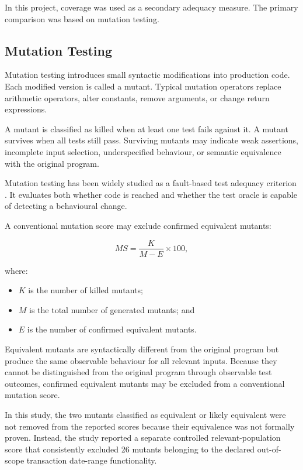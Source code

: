 \documentclass[12pt]{article}
\begin{document}
In this project, coverage was used as a secondary adequacy measure. The primary
comparison was based on mutation testing.

\subsection{Mutation Testing}

Mutation testing introduces small syntactic modifications into production
code. Each modified version is called a mutant. Typical mutation operators
replace arithmetic operators, alter constants, remove arguments, or change
return expressions.

A mutant is classified as killed when at least one test fails against it. A
mutant survives when all tests still pass. Surviving mutants may indicate weak
assertions, incomplete input selection, underspecified behaviour, or semantic
equivalence with the original program.

Mutation testing has been widely studied as a fault-based test adequacy
criterion \cite{jia2011mutation}. It evaluates both whether code is reached and
whether the test oracle is capable of detecting a behavioural change.

A conventional mutation score may exclude confirmed equivalent mutants:

\begin{equation}
MS =
\frac{K}{M-E}
\times 100,
\end{equation}

where:

\begin{itemize}
    \item \(K\) is the number of killed mutants;
    \item \(M\) is the total number of generated mutants; and
    \item \(E\) is the number of confirmed equivalent mutants.
\end{itemize}

Equivalent mutants are syntactically different from the original program but
produce the same observable behaviour for all relevant inputs. Because they
cannot be distinguished from the original program through observable test
outcomes, confirmed equivalent mutants may be excluded from a conventional
mutation score.

In this study, the two mutants classified as equivalent or likely equivalent
were not removed from the reported scores because their equivalence was not
formally proven. Instead, the study reported a separate controlled
relevant-population score that consistently excluded 26 mutants belonging to
the declared out-of-scope transaction date-range functionality.
\end{document}
